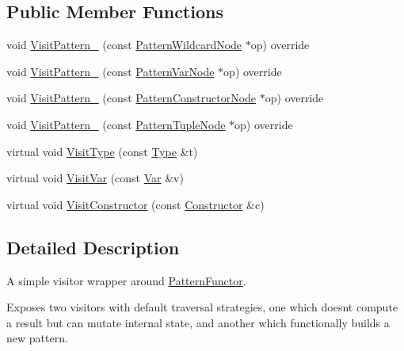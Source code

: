 \subsection*{Public Member Functions}
\begin{DoxyCompactItemize}
\item 
void \hyperlink{classtvm_1_1relay_1_1PatternVisitor_aacc0309f0a28ade3e33287906c990259}{Visit\+Pattern\+\_\+} (const \hyperlink{classtvm_1_1relay_1_1PatternWildcardNode}{Pattern\+Wildcard\+Node} $\ast$op) override
\item 
void \hyperlink{classtvm_1_1relay_1_1PatternVisitor_ad5ed2a5c3b88ec027df9e4269dff4b80}{Visit\+Pattern\+\_\+} (const \hyperlink{classtvm_1_1relay_1_1PatternVarNode}{Pattern\+Var\+Node} $\ast$op) override
\item 
void \hyperlink{classtvm_1_1relay_1_1PatternVisitor_a615c586aebfe563c7dfee3ff99e8ecb5}{Visit\+Pattern\+\_\+} (const \hyperlink{classtvm_1_1relay_1_1PatternConstructorNode}{Pattern\+Constructor\+Node} $\ast$op) override
\item 
void \hyperlink{classtvm_1_1relay_1_1PatternVisitor_a2d9a35bc9be4f5d0badb0c1bb5b86847}{Visit\+Pattern\+\_\+} (const \hyperlink{classtvm_1_1relay_1_1PatternTupleNode}{Pattern\+Tuple\+Node} $\ast$op) override
\item 
virtual void \hyperlink{classtvm_1_1relay_1_1PatternVisitor_ac65b220fb52088e5fd6b07f9e355d0b5}{Visit\+Type} (const \hyperlink{namespacetvm_1_1relay_a661d95f170bca230773914caeef3fe52}{Type} \&t)
\item 
virtual void \hyperlink{classtvm_1_1relay_1_1PatternVisitor_aa1ae59cf643dacfef3071ea551e965a5}{Visit\+Var} (const \hyperlink{classtvm_1_1relay_1_1Var}{Var} \&v)
\item 
virtual void \hyperlink{classtvm_1_1relay_1_1PatternVisitor_ace76ea7238295c0be6924c1f0fd85826}{Visit\+Constructor} (const \hyperlink{namespacetvm_1_1relay_aec85bf097deda59bd22e88475c9165e9}{Constructor} \&c)
\end{DoxyCompactItemize}


\subsection{Detailed Description}
A simple visitor wrapper around \hyperlink{classtvm_1_1relay_1_1PatternFunctor}{Pattern\+Functor}. 

Exposes two visitors with default traversal strategies, one which doesn\textquotesingle{}t compute a result but can mutate internal state, and another which functionally builds a new pattern. 

